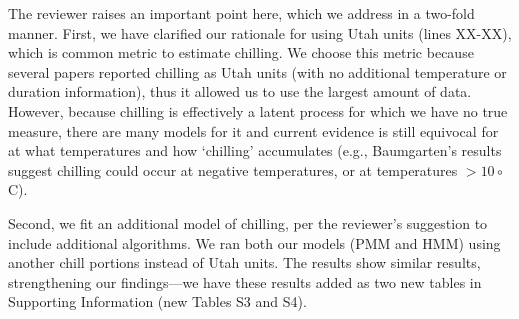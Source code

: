 \documentclass[11pt]{article}
\begin{document}
The reviewer raises an important point here, which we address in a two-fold manner. First, we have clarified our rationale for using Utah units (lines XX-XX), which is common metric to estimate chilling. We choose this metric because several papers reported chilling as Utah units (with no additional temperature or duration information), thus it allowed us to use the largest amount of data. However, because chilling is effectively a latent process for which we have no true measure, there are many models for it and current evidence is still equivocal for at what temperatures and how `chilling' accumulates (e.g., Baumgarten's results suggest chilling could occur at negative temperatures, or at temperatures $>10\circ$C). 

Second, we fit an additional model of chilling, per the reviewer's suggestion to include additional algorithms. We ran both our models (PMM and HMM) using another chill portions instead of Utah units. The results show similar results, strengthening our findings---we have these results added as two new tables in Supporting Information (new Tables S3 and S4).\\  
\end{document}
